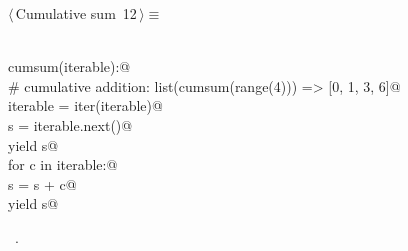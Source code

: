 \documentclass[11pt,oneside]{article}	%
\begin{document}
\begin{flushleft} \small
\begin{minipage}{\linewidth} \label{scrap17}
\protect{}$\langle\,$Cumulative sum\nobreak\ {\footnotesize 12}$\,\rangle\equiv$
\vspace{-1ex}
\begin{list}{}{} \item
\mbox{}\verb@@\\
\mbox{}\verb@def cumsum(iterable):@\\
\mbox{}\verb@    # cumulative addition: list(cumsum(range(4))) => [0, 1, 3, 6]@\\
\mbox{}\verb@    iterable = iter(iterable)@\\
\mbox{}\verb@    s = iterable.next()@\\
\mbox{}\verb@    yield s@\\
\mbox{}\verb@    for c in iterable:@\\
\mbox{}\verb@        s = s + c@\\
\mbox{}\verb@        yield s@\\
\mbox{}\verb@@{\NWsep}
\end{list}
\vspace{-1ex}
\footnotesize\addtolength{\baselineskip}{-1ex}
\begin{list}{}{\setlength{\itemsep}{-\parsep}\setlength{\itemindent}{-\leftmargin}}
\item \NWtxtMacroRefIn\ .
\end{list}
\end{minipage}\\[4ex]
\end{flushleft}




\end{document}
